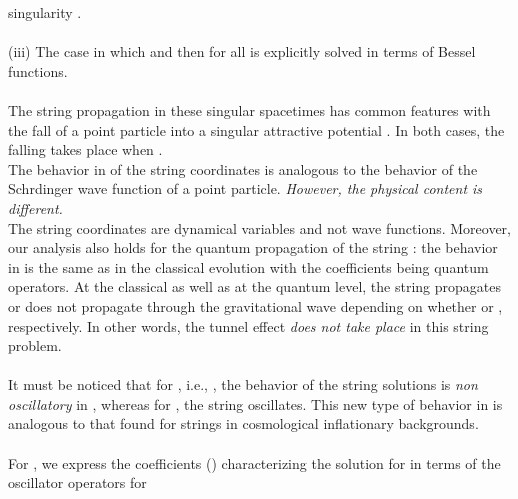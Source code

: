 \documentclass[12pt,a4paper]{article}
\begin{document}
singularity \coordHE{}. \\ \\
(iii) The case in which \coordHE{} and then 
\coordHE{} for all \coordHE{} is explicitly solved in terms of 
Bessel functions. \\ \\
The string propagation in these singular spacetimes has common features with 
the fall of a point particle into a singular attractive potential 
\coordHE{}. In both cases, the falling takes place when 
\coordHE{}. \\ The behavior in \myHighlight{$\tau $}\coordHE{} of the string coordinates 
\coordHE{} is analogous to the behavior of the 
Schr\coordHE{}dinger wave function \coordHE{} of a point particle. 
{\it However, the physical content is different.} \\
The string coordinates \coordHE{} are dynamical variables and 
not wave functions. Moreover, our analysis also holds for the quantum 
propagation of the string : the behavior in \myHighlight{$\tau $}\coordHE{} is the same as in the 
classical evolution with the coefficients being quantum operators. At the 
classical as well as at the quantum level, the string propagates or does 
not propagate through the gravitational wave depending on whether 
\coordHE{} or \coordHE{}, respectively. In other words, the tunnel 
effect {\it does not take place} in this string problem. \\
\\ It must be noticed that for \coordHE{}, i.e., \coordHE{}, the behavior of the string solutions is {\it 
non oscillatory} in 
\myHighlight{$\tau $}\coordHE{}, whereas for \myHighlight{$\tau \rightarrow \infty $}\coordHE{}, the string oscillates. This 
new type of behavior in \myHighlight{$\tau $}\coordHE{} is analogous to that found for strings in 
cosmological inflationary backgrounds. \\ \\
For \coordHE{}, we express the coefficients (\coordHE{}) characterizing the 
solution for \coordHE{} in terms of the oscillator operators for 
\end{document}
